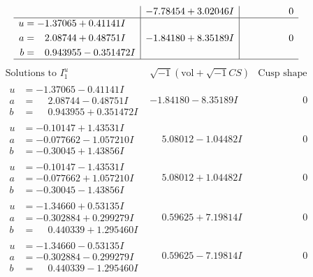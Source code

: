 \documentclass[1p]{elsarticle_modified}
\theoremstyle{definition}
\newcommand{\I}{\sqrt{-1}}
\begin{document}
$$\begin{array}{c|c|c}
 & -7.78454 + 3.02046 I & \phantom{-0.000000 } 0 \\ \hline\begin{aligned}
u &= -1.37065 + 0.41141 I \\
a &= \phantom{-}2.08744 + 0.48751 I \\
b &= \phantom{-}0.943955 - 0.351472 I\end{aligned}
 & -1.84180 + 8.35189 I & \phantom{-0.000000 } 0\\
 \hline 
 \end{array}$$\newpage$$\begin{array}{c|c|c}  
\text{Solutions to }I^u_{1}& \I (\text{vol} + \sqrt{-1}CS) & \text{Cusp shape}\\
 \hline 
\begin{aligned}
u &= -1.37065 - 0.41141 I \\
a &= \phantom{-}2.08744 - 0.48751 I \\
b &= \phantom{-}0.943955 + 0.351472 I\end{aligned}
 & -1.84180 - 8.35189 I & \phantom{-0.000000 } 0 \\ \hline\begin{aligned}
u &= -0.10147 + 1.43531 I \\
a &= -0.077662 - 1.057210 I \\
b &= -0.30045 + 1.43856 I\end{aligned}
 & \phantom{-}5.08012 - 1.04482 I & \phantom{-0.000000 } 0 \\ \hline\begin{aligned}
u &= -0.10147 - 1.43531 I \\
a &= -0.077662 + 1.057210 I \\
b &= -0.30045 - 1.43856 I\end{aligned}
 & \phantom{-}5.08012 + 1.04482 I & \phantom{-0.000000 } 0 \\ \hline\begin{aligned}
u &= -1.34660 + 0.53135 I \\
a &= -0.302884 + 0.299279 I \\
b &= \phantom{-}0.440339 + 1.295460 I\end{aligned}
 & \phantom{-}0.59625 + 7.19814 I & \phantom{-0.000000 } 0 \\ \hline\begin{aligned}
u &= -1.34660 - 0.53135 I \\
a &= -0.302884 - 0.299279 I \\
b &= \phantom{-}0.440339 - 1.295460 I\end{aligned}
 & \phantom{-}0.59625 - 7.19814 I & \phantom{-0.000000 } 0 \\ \hline\begin{aligned}

\end{aligned}
\end{array}$$
\end{document}
